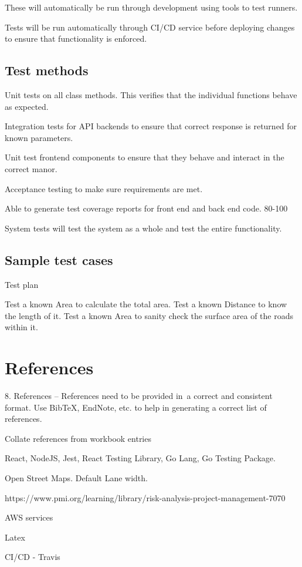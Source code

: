 \documentclass[a4paper,11pt]{article}
\begin{document}
These will automatically be run through development using tools to test runners.

Tests will be run automatically through CI/CD service before deploying changes to ensure that functionality is enforced.

\subsection{Test methods}


Unit tests on all class methods. This verifies that the individual functions behave as expected.

Integration tests for API backends to ensure that correct response is returned for known parameters.

Unit test frontend components to ensure that they behave and interact in the correct manor.

Acceptance testing to make sure requirements are met.

Able to generate test coverage reports for front end and back end code. 80-100%

System tests will test the system as a whole and test the entire functionality.


\subsection{Sample test cases}


Test plan

Test a known Area to calculate the total area.
Test a known Distance to know the length of it.
Test a known Area to sanity check the surface area of the roads within it.

\section{References}

8. References – References need to be provided in a correct and consistent format. Use BibTeX, EndNote, etc. to help in generating a correct list of references.


Collate references from workbook entries

React, NodeJS, Jest, React Testing Library, Go Lang, Go Testing Package.

Open Street Maps.
Default Lane width.

https://www.pmi.org/learning/library/risk-analysis-project-management-7070

AWS services

Latex

CI/CD - Travis
\end{document}
